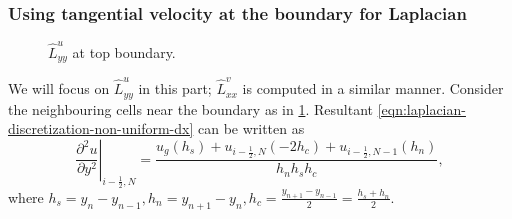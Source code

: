 \documentclass{article}
\numberwithin{equation}{section}
\begin{document}
\subsubsection{Using tangential velocity at the boundary for Laplacian}\label{subsubsec:laplacian-top}

\begin{figure}[H]
  \caption{$\hat{L}^u_{yy}$ at top boundary.}\label{fig:luxx-top}
\end{figure}

We will focus on $\hat{L}^u_{yy}$ in this part; $\hat{L}^v_{xx}$ is computed in a similar manner. Consider the neighbouring cells near the boundary as in \cref{fig:luxx-top}. Resultant \cref{eqn:laplacian-discretization-non-uniform-dx}  can be written as
\begin{equation}\label{eqn:laplacian-discretization-non-uniform-dy}
\left.\frac{\partial^2 u}{\partial y^2}\right|_{i-\frac{1}{2},N}=\frac{u_g\left(h_s\right)+u_{i-\frac{1}{2},N}\left(-2 h_c\right)+u_{i-\frac{1}{2},N-1}\left(h_n\right)}{h_n h_s h_c},
\end{equation}
where $h_s=y_{n}-y_{n-1}, h_n = y_{n+1}-y_n, h_c = \frac{y_{n+1}-y_{n-1}}{2}=\frac{h_s+h_n}{2}$.
\end{document}
